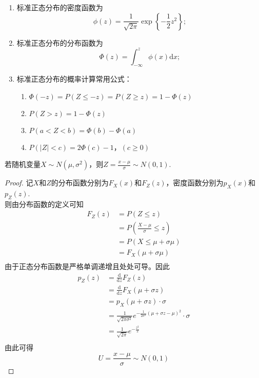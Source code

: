 \begin{remark}
    \begin{enumerate}
        \item 标准正态分布的密度函数为
        $$
        \phi(z) = \frac{1}{\sqrt{2\pi}} \exp\left\{-\frac{1}{2}z^2\right\};
        $$
        \item 标准正态分布的分布函数为
        $$
        \Phi(z) = \int_{-\infty}^z \phi(x)\text{d} x;
        $$
        \item 标准正态分布的概率计算常用公式：
        \begin{enumerate}
       \item $\Phi (-z)=P(Z\le -z)=P(Z\ge z)=1-\Phi(z)$
       \item $P(Z>z)=1-\Phi(z)$
       \item $P(a<Z<b)=\Phi(b)-\Phi(a)$
       \item $P(\left | Z \right | <c)=2\Phi(c)-1， (c\ge 0)$\\
    \end{enumerate}
    \end{enumerate}
\end{remark}
    \begin{theorem}\label{property:standard_normal}
  若随机变量$X\sim N(\mu,\sigma^{2})$，则$Z=\frac{x-\mu }{\sigma } \sim N(0,1)$.
  \end{theorem}
   \begin{proof}
   记$X$和$Z$的分布函数分别为$F_{X}(x)$和$F_{Z}(z)$，密度函数分别为$p_{X}(x)$和$p_{Z}(z)$.\\
   则由分布函数的定义可知
   \begin{equation}
   \begin{aligned}
   F_{Z}(z)
   &=P(Z\le z)\\
   &=P(\frac{X-\mu }{\sigma } \le z)\\
   &=P(X\le \mu +\sigma \mu )\\
   &=F_{X} (\mu +\sigma \mu )\\
   \end{aligned}
   \end{equation}
   由于正态分布函数是严格单调递增且处处可导。因此
   \begin{equation}
   \begin{aligned}
   p_{Z}(z)
   &=\frac{\mathrm{d}}{\mathrm{d} z} F_{Z}(z)\\
   &=\frac{\mathrm{d}}{\mathrm{d} z} F_{X}(\mu +\sigma z)\\
   &= p_{X}(\mu +\sigma z)\cdot \sigma \\
   &=\frac{1}{\sqrt{2\pi \sigma ^{2}} } e^{-\frac{1}{2\sigma ^{2}}(\mu +\sigma z -\mu )^{2} }\cdot \sigma \\
   &=\frac{1}{\sqrt{2\pi } } e^{-\frac{z^{2}}{2} }\\
  \end{aligned}
  \end{equation}
  由此可得$$U=\frac{x-\mu }{\sigma } \sim N(0,1)$$
  \end{proof}
